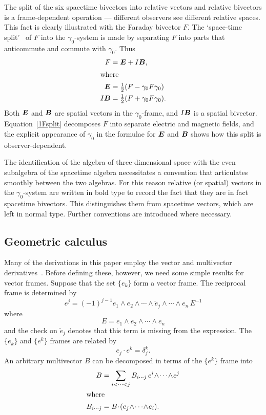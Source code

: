 \documentclass[a4paper]{article}
\numberwithin{equation}{section}
\newcommand{\dt}{\! \cdot \!}
\newcommand{\wdg}{\! \wedge \!}
\newcommand{\half}{{\textstyle \frac{1}{2}}}
\newcommand{\eqv}{=}
\newcommand{\del}{\delta}
\newcommand{\bB}{\mbox{\boldmath $B$}}
\newcommand{\bE}{\mbox{\boldmath $E$}}
\newcommand{\go}{\gamma_{0}}
\begin{document}
The split of the six spacetime bivectors into relative vectors and
relative bivectors is a frame-dependent operation --- different
observers see different relative spaces.  This fact is clearly
illustrated with the Faraday bivector $F$.  The `space-time
split'~\cite{hes74a} of $F$ into the $\go$-system is made by
separating $F$ into parts that anticommute and commute with $\go$.
Thus
%
\begin{align}
F &= \bE + I \bB, \label{1Fsplit} \\
%
\intertext{where}
\bE &= \half(F - \go F \go) \\
I\bB  &= \half(F + \go F \go).
\end{align}
%
Both $\bE$ and $\bB$ are spatial vectors in the $\go$-frame, and
$I\bB$ is a spatial bivector.  Equation~\eqref{1Fsplit} decomposes $F$
into separate electric and magnetic fields, and the explicit
appearance of $\go$ in the formulae for $\bE$ and $\bB$ shows how this
split is observer-dependent.


The identification of the algebra of three-dimensional space with the
even subalgebra of the spacetime algebra necessitates a convention
that articulates smoothly between the two algebras.  For this reason
relative (or spatial) vectors in the $\go$-system are written in bold
type to record the fact that they are in fact spacetime bivectors.
This distinguishes them from spacetime vectors, which are left in
normal type.   Further conventions are introduced where necessary.


%
\subsection{Geometric calculus}
\label{O-GC}
%

Many of the derivations in this paper employ the vector and
multivector derivatives~\cite{hes-gc,DGL93-lft}.  Before defining
these, however, we need some simple results for vector frames.
Suppose that the set $\{e_k \}$ form a vector frame.  The reciprocal
frame is determined by~\cite{hes-gc}
%
\begin{equation}
e^j = (-1)^{j-1} e_1 \wdg e_2 \wdg \cdots \wdg \check{e}_j \wdg \cdots
\wdg e_n \, E^{-1}  
\end{equation}
%
where
%
\begin{equation}
E \eqv e_1 \wdg e_2 \wdg \cdots \wdg e_n
\end{equation}
%
and the check on $\check{e}_j$ denotes that this term is missing from
the expression.  The $\{e_k \}$ and $\{e^k\}$ frames are related by
%
\begin{equation}
e_j \dt e^k=\del_j^k .
\end{equation}
%
An arbitrary multivector $B$ can be decomposed in terms of the $\{e^k\}$
frame into
%
\begin{align}
B &= \sum_{i<\cdots <j} B_{i \cdots j} \, e^i \wdg \cdots \wdg e^j \\
\intertext{where}
B_{i\cdots j} &= B \dt ( e_j \wdg \cdots \wdg e_i).
\end{align}
%
\end{document}
